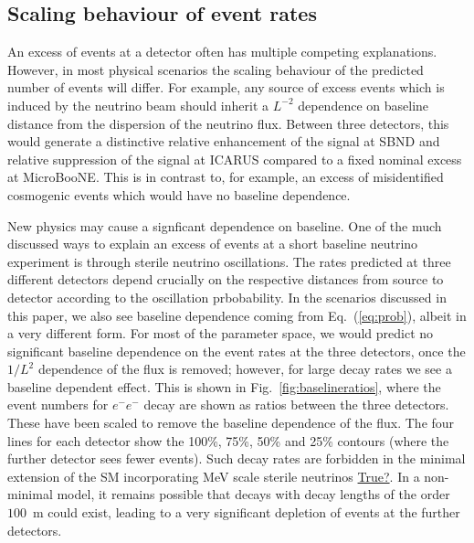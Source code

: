 \documentclass[11pt, a4paper]{article}
\newcommand{\refeq}[1]{Eq.~(\ref{#1})}
\newcommand{\reffig}[1]{Fig.~\ref{#1}}
\def\muboone{MicroBooNE}
\newcommand{\newtext}[2]{\textcolor{#1}{\ul{#2}}}
\begin{document}
\subsection{Scaling behaviour of event rates}
%

An excess of events at a detector often has multiple competing explanations.
However, in most physical scenarios the scaling behaviour of the predicted
number of events will differ. For example, any source of excess events which is
induced by the neutrino beam should inherit a $L^{-2}$ dependence on baseline
distance from the dispersion of the neutrino flux. Between three detectors,
this would generate a distinctive relative enhancement of the signal at SBND
and relative suppression of the signal at ICARUS compared to a fixed nominal
excess at \muboone. This is in contrast to, for example, an excess of
misidentified cosmogenic events which would have no baseline dependence.

New physics may cause a signficant dependence on baseline. One of the much
discussed ways to explain an excess of events at a short baseline neutrino
experiment is through sterile neutrino oscillations. The rates predicted at
three different detectors depend crucially on the respective distances from
source to detector according to the oscillation prbobability. In the scenarios
discussed in this paper, we also see baseline dependence coming from
\refeq{eq:prob}, albeit in a very different form. For most of the parameter
space, we would predict no significant baseline dependence on the event rates
at the three detectors, once the $1/L^2$ dependence of the flux is removed;
however, for large decay rates we see a baseline dependent effect. This is
shown in \reffig{fig:baselineratios}, where the event numbers for $e^-e^-$
decay are shown as ratios between the three detectors. These have been scaled
to remove the baseline dependence of the flux.  The four lines for each
detector show the 100\%, 75\%, 50\% and 25\% contours (where the further
detector sees fewer events). Such decay rates are forbidden in the minimal
extension of the SM incorporating MeV scale sterile neutrinos
\newtext{PB}{True?}. In a non-minimal model, it remains possible that decays
with decay lengths of the order $100$~m could exist, leading to a very 
significant depletion of events at the further detectors.
\end{document}
